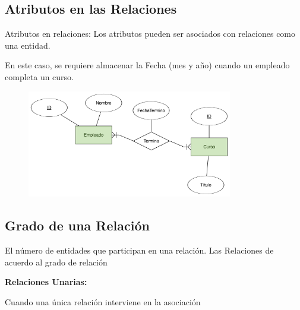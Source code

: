 \documentclass[12pt, fleqn]{report}                             %
\begin{document}
        \clearpage
        \subsection{Atributos en las Relaciones}

            Atributos en relaciones: Los atributos pueden ser asociados con relaciones
            como una entidad.

            En este caso, se requiere almacenar la Fecha (mes y año) cuando un empleado
            completa un curso.


            \begin{figure}[h]
                \centering
                \includegraphics[width=0.80\textwidth]{RelacionConAtributos}
            \end{figure}

        \subsection{Grado de una Relación}

            El número de entidades que participan en una relación.
            Las Relaciones de acuerdo al grado de relación

            \textbf{Relaciones Unarias: }

                Cuando una única relación interviene en la asociación
\end{document}
